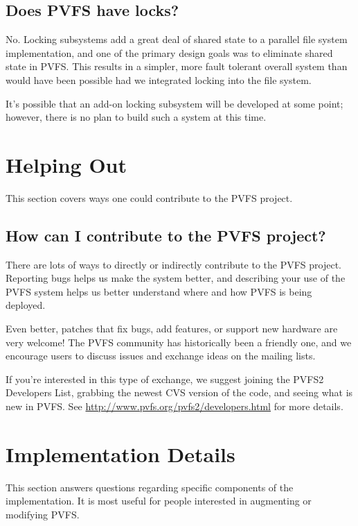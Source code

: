 \documentclass[11pt,letterpaper]{article}
\begin{document}
\subsection{Does PVFS have locks?}

No.  Locking subsystems add a great deal of shared state to a parallel file 
system implementation, and one of the primary design goals was to eliminate
shared state in PVFS.  This results in a simpler, more fault tolerant
overall system than would have been possible had we integrated locking into
the file system.

It's possible that an add-on locking subsystem will be developed at some point;
however, there is no plan to build such a system at this time.

%
%
\section{Helping Out}

This section covers ways one could contribute to the PVFS project.

\subsection{How can I contribute to the PVFS project?}
\label{sec:contributing}

There are lots of ways to directly or indirectly contribute to the PVFS
project.  Reporting bugs helps us make the system better, and describing your
use of the PVFS system helps us better understand where and how PVFS is
being deployed.

Even better, patches that fix bugs, add features, or support new hardware are
very welcome!  The PVFS community has historically been a friendly one, and we
encourage users to discuss issues and exchange ideas on the mailing lists.

If you're interested in this type of exchange, we suggest joining the PVFS2
Developers List, grabbing the newest CVS version of the code, and seeing what
is new in PVFS.  See \url{http://www.pvfs.org/pvfs2/developers.html} for more
details.

%
%
\section{Implementation Details}

This section answers questions regarding specific components of the
implementation.  It is most useful for people interested in augmenting or
modifying PVFS.
\end{document}
